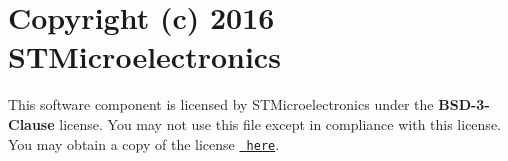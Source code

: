 \chapter{Copyright (c) 2016 STMicroelectronics}
\hypertarget{md__drivers_2_s_t_m32_f4xx___h_a_l___driver_2_license}{}\label{md__drivers_2_s_t_m32_f4xx___h_a_l___driver_2_license}
\label{md__drivers_2_s_t_m32_f4xx___h_a_l___driver_2_license_autotoc_md0}%
%


This software component is licensed by STMicroelectronics under the {\bfseries{BSD-\/3-\/\+Clause}} license. You may not use this file except in compliance with this license. You may obtain a copy of the license \href{https://opensource.org/licenses/BSD-3-Clause}{\texttt{ here}}. 